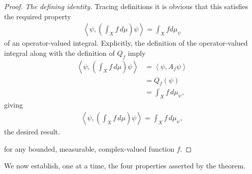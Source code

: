 \begin{proof}
\textit{The defining identity.} Tracing definitions it is obvious that this satisfies the required property
\begin{align}
    \left< \psi, \left( \int_X f \, d\mu \right) \psi \right> = \int_X f d\mu_\psi
\end{align}
of an operator-valued integral. Explicitly, the definition of the operator-valued integral along with the definition of $Q_f$ imply
\begin{align}
    \left< \psi, \left( \int_X f \, d\mu \right) \psi \right> &= \left< \psi, A_f \psi \right> \\
                                                              &= Q_f(\psi) \\
                                                              &= \int_X f \, d\mu_\psi,
\end{align}
giving
\begin{align}
    \left< \psi, \left( \int_X f \, d\mu \right) \psi \right> = \int_X f \, d\mu_\psi,
\end{align}
the desired result.

for any bounded, measurable, complex-valued function $f$.
\end{proof}

We now establish, one at a time, the four properties asserted by the theorem.

